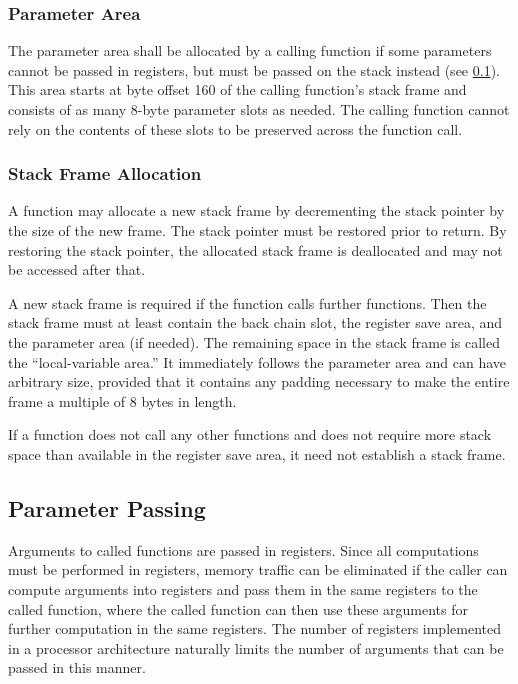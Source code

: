\documentclass[USenglish,fontsize=11pt,twoside,%
  toc=bib,toc=idx,toc=graduated,numbers=noendperiod,
  bookmarks=true,
  bookmarksnumbered=true,
  bookmarksopen=true,
  bookmarksopenlevel=1,
  breaklinks=true,
  colorlinks=true,
  linkcolor=black,
  pdfpagelayout={TwoPageRight},
  pdfusetitle=true
]{scrreprt}
\newcommand{\NBYTES}{8}
\newcommand{\STACKSIZE}{160}
\newcommand{\NBYTES}{4}
\newcommand{\STACKSIZE}{96}
\begin{document}
\subsubsection{Parameter Area}
The parameter area shall be allocated by a calling function if some
parameters cannot be passed in registers, but must be passed on the stack
instead (see \cref{parameterpassing}).  This area starts at byte offset
\STACKSIZE{} of the calling function's stack frame and consists of as many
\NBYTES{}-byte parameter slots as needed.  The calling function cannot
rely on the contents of these slots to be preserved across the function
call.

\subsubsection{Stack Frame Allocation}
A function may allocate a new stack frame by decrementing the stack
pointer by the size of the new frame.  The stack pointer must be restored
prior to return.  By restoring the stack pointer, the allocated stack
frame is deallocated and may not be accessed after that.

A new stack frame is required if the function calls further functions.
Then the stack frame must at least contain the back chain slot, the
register save area, and the parameter area (if needed).  The remaining
space in the stack frame is called the ``local-variable area.''  It
immediately follows the parameter area and can have arbitrary size,
provided that it contains any padding necessary to make the entire frame a
multiple of 8 bytes in length.

If a function does not call any other functions and does not require more
stack space than available in the register save area, it need not
establish a stack frame.

\subsection{Parameter Passing}
\label{parameterpassing}
Arguments to called functions are passed in registers.  Since all
computations must be performed in registers, memory traffic can be
eliminated if the caller can compute arguments into registers and pass
them in the same registers to the called function, where the called
function can then use these arguments for further computation in the
same registers.  The number of registers implemented in a processor
architecture naturally limits the number of arguments that can be
passed in this manner.
\end{document}
